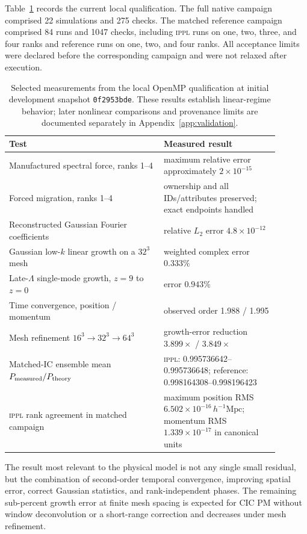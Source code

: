 \documentclass[11pt]{article}
\newcommand{\IPPL}{\textnormal{\textsc{ippl}}\xspace}
\begin{document}
Table~\ref{tab:validation-results} records the current local qualification.  The
full native campaign comprised 22 simulations and 275 checks.  The matched
reference campaign comprised 84 runs and 1047 checks, including \IPPL runs on
one, two, three, and four ranks and reference runs on one, two, and four ranks.
All acceptance limits were declared before the corresponding campaign and were
not relaxed after execution.

\begin{table}[htbp]
  \centering
  \caption{Selected measurements from the local OpenMP qualification at
  initial development snapshot \texttt{0f2953bde}.  These results establish
  linear-regime behavior; later nonlinear comparisons and provenance limits
  are documented separately in Appendix~\ref{app:validation}.}
  \label{tab:validation-results}
  \begin{tabular}{@{}p{0.51\linewidth}p{0.38\linewidth}@{}}
    \toprule
    Test & Measured result \\
    \midrule
    Manufactured spectral force, ranks 1--4 & maximum relative error
      approximately $2\times10^{-15}$ \\
    Forced migration, ranks 1--4 & ownership and all IDs/attributes preserved;
      exact endpoints handled \\
    Reconstructed Gaussian Fourier coefficients & relative $L_2$ error
      $4.8\times10^{-12}$ \\
    Gaussian low-$k$ linear growth on a $32^3$ mesh & weighted complex error
      $0.333\%$ \\
    Late-$\Lambda$ single-mode growth, $z=9$ to $z=0$ & error $0.943\%$ \\
    Time convergence, position / momentum & observed order 1.988 / 1.995 \\
    Mesh refinement $16^3\rightarrow32^3\rightarrow64^3$ & growth-error
      reduction $3.899\times$ / $3.849\times$ \\
    Matched-IC ensemble mean $P_{\rm measured}/P_{\rm theory}$ & \IPPL:
      0.995736642--0.995736648; reference: 0.998164308--0.998196423 \\
    \IPPL{} rank agreement in matched campaign & maximum position RMS
      $6.502\times10^{-16}\,h^{-1}\mathrm{Mpc}$; momentum RMS
      $1.339\times10^{-17}$ in canonical units \\
    \bottomrule
  \end{tabular}
\end{table}

The result most relevant to the physical model is not any single small residual,
but the combination of second-order temporal convergence, improving spatial
error, correct Gaussian statistics, and rank-independent phases.  The remaining
sub-percent growth error at finite mesh spacing is expected for CIC PM without
window deconvolution or a short-range correction and decreases under mesh
refinement.
\end{document}
